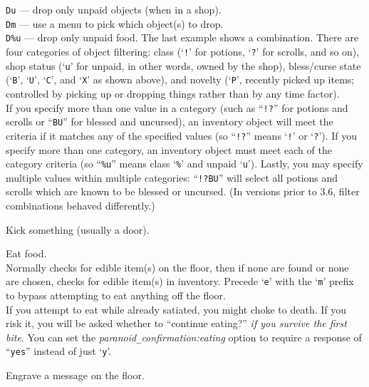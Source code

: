 {\tt Du}  --- drop only unpaid objects (when in a shop).\\
{\tt Dm}  --- use a menu to pick which object(s) to drop.\\
{\tt D\%u} --- drop only unpaid food.
The last example shows a combination.
There are four categories of object filtering: class (`{\tt !}' for
potions, `{\tt ?}' for scrolls, and so on), shop status (`{\tt u}' for
unpaid, in other words, owned by the shop), bless/curse state
(`{\tt B}', `{\tt U}', `{\tt C}', and `{\tt X}' as shown above),
and novelty (`{\tt P}', recently picked up items; controlled by picking
up or dropping things rather than by any time factor).
\\
If you specify more than one value in a category (such as ``{\tt !?}'' for
potions and scrolls or ``{\tt BU}'' for blessed and uncursed), an inventory
object will meet the criteria if it matches any of the specified
values (so ``{\tt !?}'' means `{\tt !}' or `{\tt ?}').
If you specify more than one category, an inventory object must meet
each of the category criteria (so ``{\tt \%u}'' means class `{\tt \%}' and
unpaid `{\tt u}').
Lastly, you may specify multiple values within multiple categories:
``{\tt !?BU}'' will select all potions and scrolls which are known to be
blessed or uncursed.
(In versions prior to 3.6, filter combinations behaved differently.)
\item[\tb{\^{}D}]
Kick something (usually a door).
\item[\tb{e}]
Eat food.\\
Normally checks for edible item(s) on the floor, then if none are found
or none are chosen, checks for edible item(s) in inventory.
Precede `{\tt e}' with the `{\tt m}' prefix to bypass attempting to eat
anything off the floor.\\
If you attempt to eat while already satiated, you might choke to death.
If you risk it, you will be asked whether
to ``continue eating?'' {\it if you survive the first bite\/}.
You can set the
{\it paranoid\verb+_+confirmation:eating\/}
option to require a response of ``{\tt yes}'' instead of just `{\tt y}'.
\item[\tb{E}]
Engrave a message on the floor.\\

